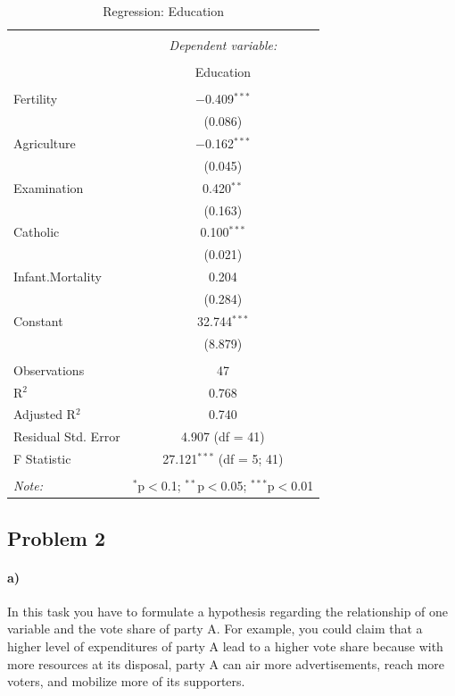 \documentclass[12pt]{article}\usepackage[]{graphicx}\usepackage[]{color}
\begin{document}
\begin{table}[!htbp] \centering 
  \caption{Regression: Education} 
  \label{} 
\begin{tabular}{@{\extracolsep{5pt}}lc} 
\\[-1.8ex]\hline 
\hline \\[-1.8ex] 
 & \multicolumn{1}{c}{\textit{Dependent variable:}} \\ 
\cline{2-2} 
\\[-1.8ex] & Education \\ 
\hline \\[-1.8ex] 
 Fertility & $-$0.409$^{***}$ \\ 
  & (0.086) \\ 
  Agriculture & $-$0.162$^{***}$ \\ 
  & (0.045) \\ 
  Examination & 0.420$^{**}$ \\ 
  & (0.163) \\ 
  Catholic & 0.100$^{***}$ \\ 
  & (0.021) \\ 
  Infant.Mortality & 0.204 \\ 
  & (0.284) \\ 
  Constant & 32.744$^{***}$ \\ 
  & (8.879) \\ 
 \hline \\[-1.8ex] 
Observations & 47 \\ 
R$^{2}$ & 0.768 \\ 
Adjusted R$^{2}$ & 0.740 \\ 
Residual Std. Error & 4.907 (df = 41) \\ 
F Statistic & 27.121$^{***}$ (df = 5; 41) \\ 
\hline 
\hline \\[-1.8ex] 
\textit{Note:}  & \multicolumn{1}{r}{$^{*}$p$<$0.1; $^{**}$p$<$0.05; $^{***}$p$<$0.01} \\ 
\end{tabular} 
\end{table}

\subsection*{Problem 2}

\paragraph{a)} In this task you have to formulate a hypothesis regarding the relationship of one variable and the vote share of party A. For example, you could claim that a higher level of expenditures of party A lead to a higher vote share because with more resources at its disposal, party A can air more advertisements, reach more voters, and mobilize more of its supporters.
\end{document}
